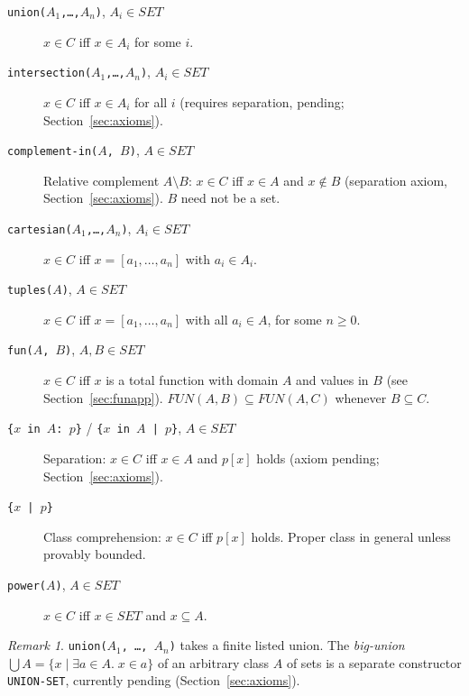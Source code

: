 \documentclass{amsbook}[openany]
\theoremstyle{definition}
\theoremstyle{remark}
\newtheorem{remark}{Remark}[chapter]
\theoremstyle{remark}
\begin{document}
\begin{description}

\item[\texttt{union($A_1$,\ldots,$A_n$)}, $A_i \in \mathit{SET}$]
  $x \in C$ iff $x \in A_i$ for some $i$.

\item[\texttt{intersection($A_1$,\ldots,$A_n$)}, $A_i \in \mathit{SET}$]
  $x \in C$ iff $x \in A_i$ for all $i$
  (requires separation, pending; Section~\ref{sec:axioms}).

\item[\texttt{complement-in($A$, $B$)}, $A \in \mathit{SET}$]
  Relative complement $A \setminus B$: $x \in C$ iff $x \in A$ and
  $x \notin B$ (separation axiom, Section~\ref{sec:axioms}).
  $B$ need not be a set.

\item[\texttt{cartesian($A_1$,\ldots,$A_n$)}, $A_i \in \mathit{SET}$]
  $x \in C$ iff $x = [a_1,\ldots,a_n]$ with $a_i \in A_i$.

\item[\texttt{tuples($A$)}, $A \in \mathit{SET}$]
  $x \in C$ iff $x = [a_1,\ldots,a_n]$ with all $a_i \in A$,
  for some $n \ge 0$.

\item[\texttt{fun($A$, $B$)}, $A, B \in \mathit{SET}$]
  $x \in C$ iff $x$ is a total function with domain $A$ and values in $B$
  (see Section~\ref{sec:funapp}).
  $\mathit{FUN}(A,B) \subseteq \mathit{FUN}(A,C)$ whenever $B \subseteq C$.

\item[\texttt{\{$x$ in $A$: $p$\}} / \texttt{\{$x$ in $A$ | $p$\}}, $A \in \mathit{SET}$]
  Separation: $x \in C$ iff $x \in A$ and $p[x]$ holds
  (axiom pending; Section~\ref{sec:axioms}).

\item[\texttt{\{$x$ | $p$\}}]
  Class comprehension: $x \in C$ iff $p[x]$ holds.  Proper class in
  general unless provably bounded.

\item[\texttt{power($A$)}, $A \in \mathit{SET}$]
  $x \in C$ iff $x \in \mathit{SET}$ and $x \subseteq A$.

\end{description}

\begin{remark}
\texttt{union($A_1$, \ldots, $A_n$)} takes a finite listed union.
The \emph{big-union} $\bigcup A = \{x \mid \exists a \in A.\; x \in a\}$
of an arbitrary class $A$ of sets is a separate constructor
\texttt{UNION-SET}, currently pending (Section~\ref{sec:axioms}).
\end{remark}
\end{document}
